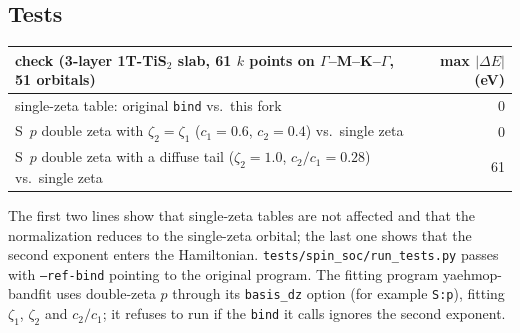 \documentclass[11pt,a4paper]{article}
\newcommand{\file}[1]{\texttt{#1}}
\newcommand{\opt}[1]{\texttt{#1}}
\begin{document}
\subsection{Tests}
\begin{center}
\begin{tabular}{p{9.2cm} r}
\toprule
check (3-layer 1T-TiS$_2$ slab, 61 $k$ points on $\Gamma$--M--K--$\Gamma$, 51 orbitals) & max $|\Delta E|$ (eV) \\
\midrule
single-zeta table: original \texttt{bind} vs.\ this fork & 0 \\
S~$p$ double zeta with $\zeta_2=\zeta_1$ ($c_1=0.6$, $c_2=0.4$) vs.\ single zeta & 0 \\
S~$p$ double zeta with a diffuse tail ($\zeta_2=1.0$, $c_2/c_1=0.28$) vs.\ single zeta & 61 \\
\bottomrule
\end{tabular}
\end{center}
The first two lines show that single-zeta tables are not affected and that the
normalization reduces to the single-zeta orbital; the last one shows that the second
exponent enters the Hamiltonian. \file{tests/spin\_soc/run\_tests.py} passes with
\opt{--ref-bind} pointing to the original program. The fitting program yaehmop-bandfit
uses double-zeta $p$ through its \texttt{basis\_dz} option (for example \texttt{S:p}),
fitting $\zeta_1$, $\zeta_2$ and $c_2/c_1$; it refuses to run if the \texttt{bind} it calls
ignores the second exponent.
\end{document}
